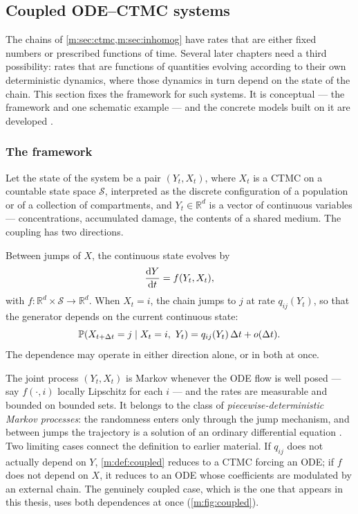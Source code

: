 \subsection{Coupled ODE--CTMC systems}
\label{m:sec:coupled}

The chains of \cref{m:sec:ctmc,m:sec:inhomog} have rates that are either fixed
numbers or prescribed functions of time. Several later chapters need a third
possibility: rates that are functions of quantities evolving according to their
own deterministic dynamics, where those dynamics in turn depend on the state of
the chain. This section fixes the framework for such systems. It is conceptual
--- the framework and one schematic example --- and the concrete models built on
it are developed .

\subsubsection{The framework}
\label{m:sec:coupledframe}

Let the state of the system be a pair $(Y_t,X_t)$, where $X_t$ is a CTMC on a
countable state space $\mathcal S$, interpreted as the discrete configuration
of a population or of a collection of compartments, and $Y_t\in\mathbb R^d$ is
a vector of continuous variables --- concentrations, accumulated damage, the
contents of a shared medium. The coupling has two directions.

\begin{definition}
\label{m:def:coupled}
Between jumps of $X$, the continuous state evolves by
\begin{equation}
\label{m:eq:coupledode}
\frac{\mathrm{d} Y}{\mathrm{d} t} = f(Y_t,X_t),
\end{equation}
with $f:\mathbb R^d\times\mathcal S\to\mathbb R^d$. When $X_t=i$, the chain
jumps to $j$ at rate $q_{ij}(Y_t)$, so that the generator depends on the current
continuous state:
\begin{equation}
\label{m:eq:coupledrates}
\mathbb{P}\!\left(X_{t+\Delta t}=j\mid X_t=i,\ Y_t\right) = q_{ij}(Y_t)\,\Delta t + o(\Delta t).
\end{equation}
The dependence may operate in either direction alone, or in both at once.
\end{definition}

The joint process $(Y_t,X_t)$ is Markov whenever the ODE flow is well posed ---
say $f(\cdot,i)$ locally Lipschitz for each $i$ --- and the rates are
measurable and bounded on bounded sets. It belongs to the class of
\emph{piecewise-deterministic Markov processes}: the randomness enters only
through the jump mechanism, and between jumps the trajectory is a solution of an
ordinary differential equation \cite{Davis1993}. Two limiting cases connect the
definition to earlier material. If $q_{ij}$ does not actually depend on $Y$,
\cref{m:def:coupled} reduces to a CTMC forcing an ODE; if $f$ does not depend on
$X$, it reduces to an ODE whose coefficients are modulated by an external chain.
The genuinely coupled case, which is the one that appears in this thesis, uses
both dependences at once (\cref{m:fig:coupled}).

